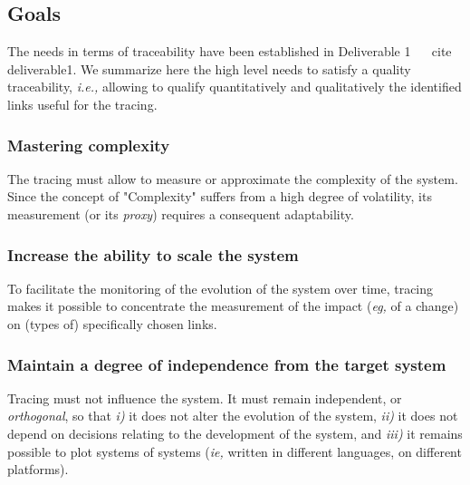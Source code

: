 \subsection{Goals}
The needs in terms of traceability have been established in Deliverable 1 ~ \ cite {deliverable1}. We summarize here the high level needs to satisfy a quality traceability, \textit{i.e.,} allowing to qualify quantitatively and qualitatively the identified links useful for the tracing.
    
\subsubsection{Mastering complexity}
The tracing must allow to measure or approximate the complexity of the system. Since the concept of "Complexity" suffers from a high degree of volatility, its measurement (or its \textit{proxy}) requires a consequent adaptability.
    
\subsubsection{Increase the ability to scale the system}
To facilitate the monitoring of the evolution of the system over time, tracing makes it possible to concentrate the measurement of the impact (\textit{eg,} of a change) on (types of) specifically chosen links.
    
\subsubsection{Maintain a degree of independence from the target system}
Tracing must not influence the system. It must remain independent, or \textit{orthogonal}, so that \textit{i)} it does not alter the evolution of the system, \textit{ii)} it does not depend on decisions relating to the development of the system, and \textit{iii)} it remains possible to plot systems of systems (\textit{ie,} written in different languages, on different platforms).%

